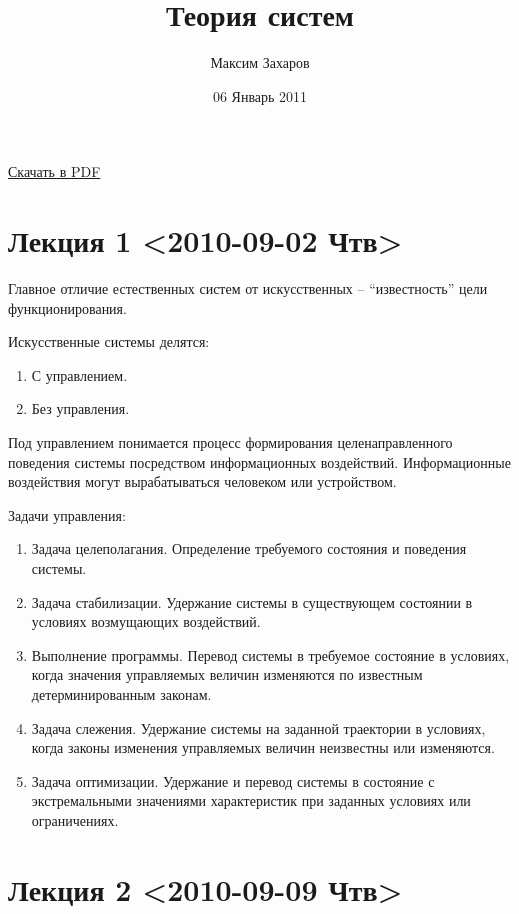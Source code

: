 \documentclass[12pt, russian, oneside, article]{ncc}
\begin{document}
\title{Теория систем}
\author{Максим Захаров}
\date{06 Январь 2011}
\maketitle

\setcounter{tocdepth}{3}
\tableofcontents
\vspace*{1cm}


\href{file:///home/maxim/Documents/Git/lectures/other/TS_Lectures.pdf}{Скачать в PDF}

\section{Лекция 1 <2010-09-02 Чтв>}
\label{sec-1}


Главное отличие естественных систем от искусственных -- ``известность'' цели функционирования.

Искусственные системы делятся:
\begin{enumerate}
\item С управлением.
\item Без управления.
\end{enumerate}

Под управлением понимается процесс формирования целенаправленного поведения системы посредством информационных воздействий. Информационные воздействия могут вырабатываться человеком или устройством.   
  
Задачи управления:
\begin{enumerate}
\item Задача целеполагания. Определение требуемого состояния и поведения системы.
\item Задача стабилизации. Удержание системы в существующем состоянии в условиях возмущающих воздействий.
\item Выполнение программы. Перевод системы в требуемое состояние в условиях, когда значения управляемых величин изменяются по известным детерминированным законам.
\item Задача слежения. Удержание системы на заданной траектории в условиях, когда законы изменения управляемых величин неизвестны или изменяются.
\item Задача оптимизации. Удержание и перевод системы в состояние с экстремальными значениями характеристик при заданных условиях или ограничениях.
\end{enumerate}
\section{Лекция 2 <2010-09-09 Чтв>}
\label{sec-2}
\end{document}
